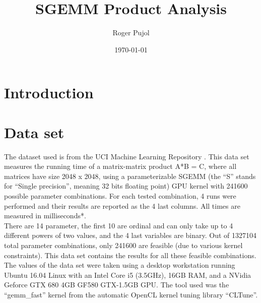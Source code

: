 \documentclass[sigconf,authorversion]{acmart}
\title{SGEMM Product Analysis}
\author{Roger Pujol}
\affiliation{%
  \institution{Universitat Politècnica de Catalunya (UPC)}
  \city{Barcelona}
  \country{Spain}}
\date{\today}
\begin{document}
\maketitle

\section{Introduction}
\section{Data set}
The dataset used is from the UCI Machine Learning Repository \cite{dataset-url} \cite{dataset-paper}. This data set measures the running time of a matrix-matrix product A*B = C, where all matrices have size 2048 x 2048, using a parameterizable SGEMM (the ``S'' stands for ``Single precision'', meaning 32 bits floating point) GPU kernel with 241600 possible parameter combinations. For each tested combination, 4 runs were performed and their results are reported as the 4 last columns. All times are measured in milliseconds*. \\
There are 14 parameter, the first 10 are ordinal and can only take up to 4 different powers of two values, and the 4 last variables are binary. Out of 1327104 total parameter combinations, only 241600 are feasible (due to various kernel constraints). This data set contains the results for all these feasible combinations.\\
The values of the data set were taken using a desktop workstation running Ubuntu 16.04 Linux with an Intel Core i5 (3.5GHz), 16GB RAM, and a NVidia Geforce GTX 680 4GB GF580 GTX-1.5GB GPU. The tool used was the ``gemm\_fast'' kernel from the automatic OpenCL kernel tuning library ``CLTune''.
\end{document}
